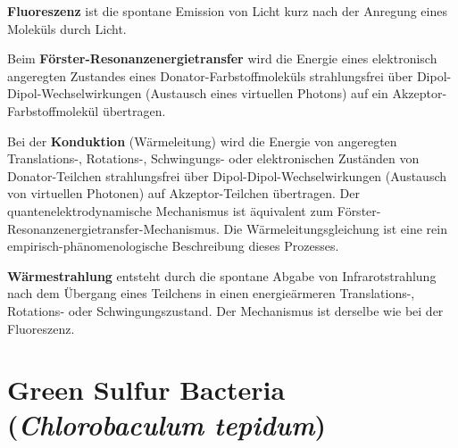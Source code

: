 \documentclass[9pt]{report}
\begin{document}
\textbf{Fluoreszenz} ist die spontane Emission von Licht kurz nach der Anregung eines Moleküls durch Licht.

Beim \textbf{Förster-Resonanzenergietransfer} wird die Energie eines elektronisch angeregten Zustandes eines Donator-Farbstoffmoleküls strahlungsfrei über Dipol-Dipol-Wechselwirkungen (Austausch eines virtuellen Photons) auf ein Akzeptor-Farbstoffmolekül übertragen.

Bei der \textbf{Konduktion} (Wärmeleitung) wird die Energie von angeregten Translations-, Rotations-, Schwingungs- oder elektronischen Zuständen von Donator-Teilchen strahlungsfrei über Dipol-Dipol-Wechselwirkungen (Austausch von virtuellen Photonen) auf Akzeptor-Teilchen übertragen. Der quantenelektrodynamische Mechanismus ist äquivalent zum Förster-Resonanzenergietransfer-Mechanismus. Die Wärmeleitungsgleichung ist eine rein empirisch-phänomenologische Beschreibung dieses Prozesses.

\textbf{Wärmestrahlung} entsteht durch die spontane Abgabe von Infrarotstrahlung nach dem Übergang eines Teilchens in einen energieärmeren Translations-, Rotations- oder Schwingungszustand. Der Mechanismus ist derselbe wie bei der Fluoreszenz.








\section{Green Sulfur Bacteria (\textit{Chlorobaculum tepidum})}
\end{document}
